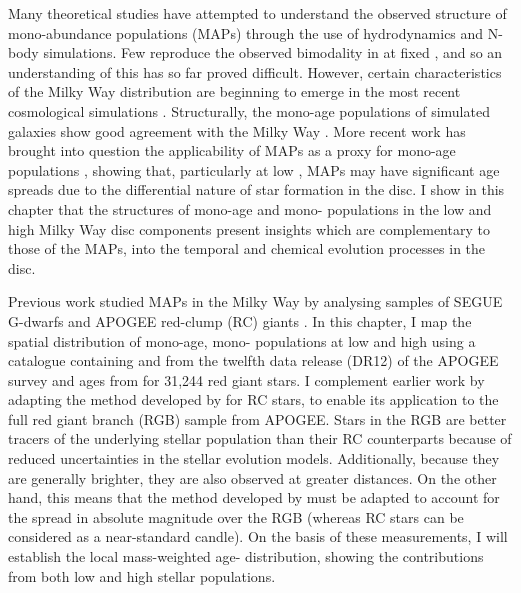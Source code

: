  Many theoretical studies have attempted to understand the observed structure of mono-abundance populations (MAPs) through the use of hydrodynamics and N-body simulations. Few reproduce the observed bimodality in \afe{} at fixed \feh{}, and so an understanding of this has so far proved difficult. However, certain characteristics of the Milky Way \afe{} distribution are beginning to emerge in the most recent cosmological simulations  \citep{2016arXiv160804133M}. Structurally, the mono-age populations of simulated galaxies show good agreement with the Milky Way \citep[e.g.][]{2013MNRAS.436..625S,2013ApJ...773...43B,2014MNRAS.442.2474M,2014MNRAS.443.2452M}. More recent work has brought into question the applicability of MAPs as a proxy for mono-age populations \citep{2017ApJ...834...27M}, showing that, particularly at low \afe{}, MAPs may have significant age spreads due to the differential nature of star formation in the disc. I show in this chapter that the structures of mono-age and mono-\feh{} populations in the low and high \afe{} Milky Way disc components present insights which are complementary to those of the MAPs, into the temporal and chemical evolution processes in the disc.

 Previous work studied MAPs in the Milky Way by analysing samples of SEGUE G-dwarfs \citep{2012ApJ...755..115B,2012ApJ...753..148B,2012ApJ...751..131B} and APOGEE red-clump (RC) giants \citep{2016ApJ...823...30B}. In this chapter, I map the spatial distribution of mono-age, mono-\feh{} populations at low and high \afe{} using a catalogue containing \feh{} and \afe{} from the twelfth data release (DR12) of the APOGEE survey \citep{2015arXiv150905420M} and ages from \citet{2016MNRAS.456.3655M} for 31,244 red giant stars. I complement earlier work by adapting the method developed by \citet{2016ApJ...823...30B} for RC stars, to enable its application to the full red giant branch (RGB) sample from APOGEE. Stars in the RGB are better tracers of the underlying stellar population than their RC counterparts because of reduced uncertainties in the stellar evolution models. Additionally, because they are generally brighter, they are also observed at greater distances. On the other hand, this means that the method developed by \citet{2016ApJ...823...30B} must be adapted to account for the spread in absolute magnitude over the RGB (whereas RC stars can be considered as a near-standard candle). On the basis of these measurements, I will establish the local mass-weighted age-\feh{} distribution, showing the contributions from both low and high \afe{} stellar populations.

